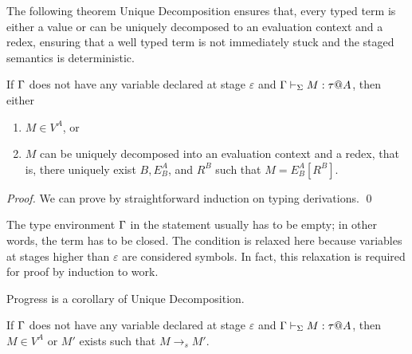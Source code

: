The following theorem Unique Decomposition ensures that, every typed
term is either a value or can be uniquely decomposed to an evaluation
context and a redex, ensuring that a well typed term is not
immediately stuck and the staged semantics is deterministic.

\begin{theorem}
  If $\Gamma$ does not have any variable declared at stage $\varepsilon$ 
  and $\Gamma \vdash_\Sigma M : \tau @ A$, then either
  \begin{enumerate}
  \item $ M \in V^A$, or
  \item $M$ can be uniquely decomposed into an evaluation context and a redex, that is, there uniquely exist $B, E^A_B$, and $R^B$ such that $M = E^A_B[R^B]$.
  \end{enumerate}
\end{theorem}

\begin{proof}
  We can prove by straightforward induction on typing derivations.
  \qed
\end{proof}

The type environment $\Gamma$ in the statement usually has to be empty;
in other words, the term has to be closed.  The condition is relaxed here
because variables at stages higher than \(\varepsilon\) are considered
symbols.  In fact, this relaxation is required for proof by induction
to work.

      
Progress is a corollary of Unique Decomposition.

\begin{corollary}[Progress]
	If $\Gamma$ does not have any variable declared at stage $\varepsilon$ and $\Gamma \vdash_\Sigma M : \tau  @ A$, then
	$ M \in V^A $ or $M'$ exists such that $M \longrightarrow_s M'$.
\end{corollary}

